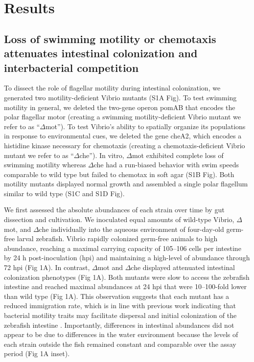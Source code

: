 \section{Results}

\subsection{Loss of swimming motility or chemotaxis attenuates intestinal colonization and interbacterial competition}
To dissect the role of flagellar motility during intestinal colonization, we generated two motility-deficient Vibrio mutants (S1A Fig). To test swimming motility in general, we deleted the two-gene operon pomAB that encodes the polar flagellar motor (creating a swimming motility-deficient Vibrio mutant we refer to as ``$\Delta$mot''). To test Vibrio's ability to spatially organize its populations in response to environmental cues, we deleted the gene cheA2, which encodes a histidine kinase necessary for chemotaxis (creating a chemotaxis-deficient Vibrio mutant we refer to as ``$\Delta$che''). In vitro, $\Delta$mot exhibited complete loss of swimming motility whereas $\Delta$che had a run-biased behavior with swim speeds comparable to wild type but failed to chemotax in soft agar (S1B Fig). Both motility mutants displayed normal growth and assembled a single polar flagellum similar to wild type (S1C and S1D Fig). 

We first assessed the absolute abundances of each strain over time by gut dissection and cultivation. We inoculated equal amounts of wild-type Vibrio, $\Delta$mot, and $\Delta$che individually into the aqueous environment of four-day-old germ-free larval zebrafish. Vibrio rapidly colonized germ-free animals to high abundance, reaching a maximal carrying capacity of 105–106 cells per intestine by 24 h post-inoculation (hpi) and maintaining a high-level of abundance through 72 hpi (Fig 1A). In contrast, $\Delta$mot and $\Delta$che displayed attenuated intestinal colonization phenotypes (Fig 1A). Both mutants were slow to access the zebrafish intestine and reached maximal abundances at 24 hpi that were 10–100-fold lower than wild type (Fig 1A). This observation suggests that each mutant has a reduced immigration rate, which is in line with previous work indicating that bacterial motility traits may facilitate dispersal and initial colonization of the zebrafish intestine \cite{robinson_experimental_2018,burns_interhost_2017}. Importantly, differences in intestinal abundances did not appear to be due to differences in the water environment because the levels of each strain outside the fish remained constant and comparable over the assay period (Fig 1A inset).

